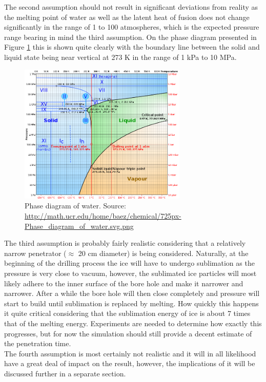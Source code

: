 \noindent
The second assumption should not result in significant deviations from reality as the melting point of water as well as the latent heat of fusion does not change significantly in the range of 1 to 100 atmospheres, which is the expected pressure range bearing in mind the third assumption. On the phase diagram presented in Figure \ref{fig:waterPhase} this is shown quite clearly with the boundary line between the solid and liquid state being near vertical at 273 K in the range of 1 kPa to 10 MPa.\\

\begin{figure}[ht]
	\centering
	\includegraphics[width=8cm]{figures/LAMC/waterPhase}
	\caption{Phase diagram of water. Source: \url{http://math.ucr.edu/home/baez/chemical/725px-Phase_diagram_of_water.svg.png}}
	\label{fig:waterPhase}
\end{figure}

\noindent
The third assumption is probably fairly realistic considering that a relatively narrow penetrator ($\approx$ 20 cm diameter) is being considered. Naturally, at the beginning of the drilling process the ice will have to undergo sublimation as the pressure is very close to vacuum, however, the sublimated ice particles will most likely adhere to the inner surface of the bore hole and make it narrower and narrower. After a while the bore hole will then close completely and pressure will start to build until sublimation is replaced by melting. How quickly this happens it quite critical considering that the sublimation energy of ice is about 7 times\cite{website:engineeringToolbox} that of the melting energy. Experiments are needed to determine how exactly this progresses, but for now the simulation should still provide a decent estimate of the penetration time.\\

\noindent
The fourth assumption is most certainly not realistic and it will in all likelihood have a great deal of impact on the result, however, the implications of it will be discussed further in a separate section.

